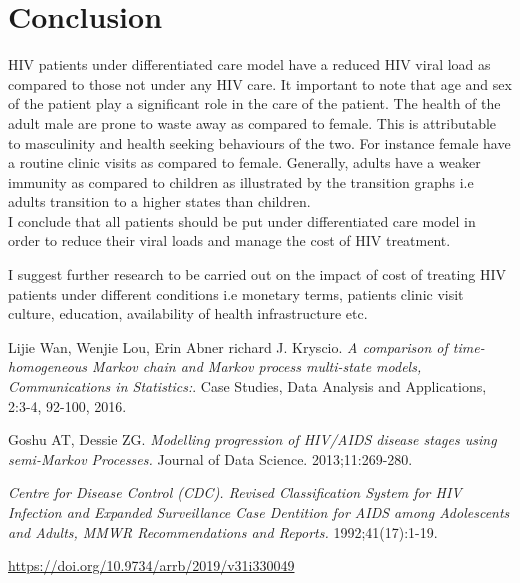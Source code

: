 \documentclass[11pt,a4paper]{article}
\begin{document}
\section{Conclusion}

HIV patients under differentiated care model have a reduced HIV viral load as compared to those not under any HIV care. It important to note that age and sex of the patient play a significant role in the care of the patient. The health of the adult male are prone to waste away as compared to female. This is attributable to masculinity and health seeking behaviours of the two. For instance female have a routine clinic visits as compared to female. Generally, adults have a weaker immunity as compared to children as illustrated by the transition graphs i.e adults transition to a higher states than children.\\
I conclude that all patients should be put under differentiated care model in order to reduce their viral loads and manage the cost of HIV treatment.

I suggest further research to be carried out on the impact of cost of treating HIV patients under different conditions i.e monetary terms, patients clinic visit culture, education, availability of health infrastructure etc.
\newpage
\begin{thebibliography}{9}
Lijie Wan, Wenjie Lou, Erin Abner richard J. Kryscio. 
\textit{A comparison of time-homogeneous Markov chain and Markov process multi-state models, Communications in Statistics:}. 
Case Studies, Data Analysis and Applications, 2:3-4, 92-100, 2016.


Goshu AT, Dessie ZG. 
\textit{Modelling progression of HIV/AIDS disease stages using semi-Markov Processes.} Journal of Data Science. 2013;11:269-280.

\textit{Centre for Disease Control (CDC). Revised Classification System for HIV Infection and Expanded Surveillance Case Dentition for AIDS among Adolescents and Adults, MMWR Recommendations and Reports.} 1992;41(17):1-19.

\url{https://doi.org/10.9734/arrb/2019/v31i330049}
\end{thebibliography}
\end{document}
